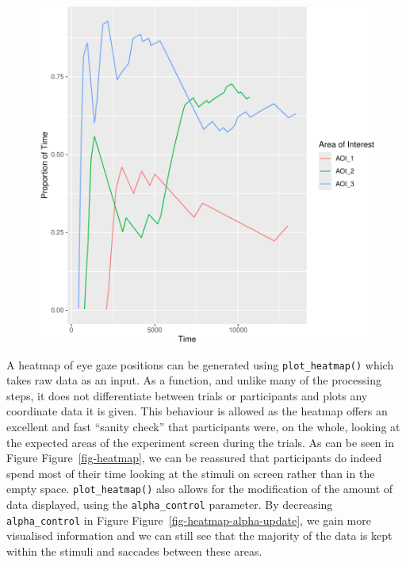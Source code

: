 \documentclass[
  man,
  floatsintext,
  longtable,
  nolmodern,
  notxfonts,
  notimes,
  colorlinks=true,linkcolor=blue,citecolor=blue,urlcolor=blue]{apa7}
\begin{document}
\begin{figure}[H]
\begin{minipage}{0.50\linewidth}
{\includegraphics{BRM_ms_files/figure-pdf/fig-prop-1.pdf}

}

\end{minipage}%

\end{figure}%

A heatmap of eye gaze positions can be generated using
\texttt{plot\_heatmap()} which takes raw data as an input. As a
function, and unlike many of the processing steps, it does not
differentiate between trials or participants and plots any coordinate
data it is given. This behaviour is allowed as the heatmap offers an
excellent and fast ``sanity check'' that participants were, on the
whole, looking at the expected areas of the experiment screen during the
trials. As can be seen in Figure Figure~\ref{fig-heatmap}, we can be
reassured that participants do indeed spend most of their time looking
at the stimuli on screen rather than in the empty space.
\texttt{plot\_heatmap()} also allows for the modification of the amount
of data displayed, using the \texttt{alpha\_control} parameter. By
decreasing \texttt{alpha\_control} in Figure
Figure~\ref{fig-heatmap-alpha-update}, we gain more visualised
information and we can still see that the majority of the data is kept
within the stimuli and saccades between these areas.
\end{document}
